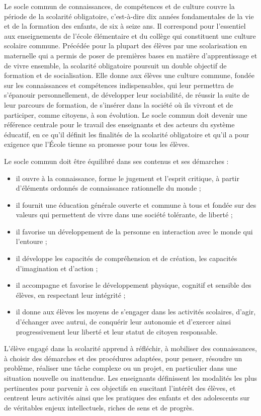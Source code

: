 Le socle commun de connaissances, de compétences et de culture couvre la période de la scolarité obligatoire, c’est-à-dire dix années fondamentales de la vie et de la formation des enfants, de six à seize ans. Il correspond pour l’essentiel aux enseignements de l’école élémentaire et du collège qui constituent une culture scolaire commune. Précédée pour la plupart des élèves par une scolarisation en maternelle qui a permis de poser de premières bases en matière d’apprentissage et de vivre ensemble, la scolarité obligatoire poursuit un double objectif de formation et de socialisation. Elle donne aux élèves une culture commune, fondée sur les connaissances et compétences indispensables, qui leur permettra de s’épanouir personnellement, de développer leur sociabilité, de réussir la suite de leur parcours de formation, de s’insérer dans la société où ils vivront et de participer, comme citoyens, à son évolution. Le socle commun doit devenir une référence centrale pour le travail des enseignants et des acteurs du système éducatif, en ce qu’il définit les finalités de la scolarité obligatoire et qu’il a pour exigence que l’École tienne sa promesse pour tous les élèves.

Le socle commun doit être équilibré dans ses contenus et ses démarches :
\begin{itemize}
\item il ouvre à la connaissance, forme le jugement et l’esprit critique, à partir d’éléments ordonnés de connaissance rationnelle du monde ;
\item il fournit une éducation générale ouverte et commune à tous et fondée sur des valeurs qui permettent de vivre dans une société tolérante, de liberté ;
\item il favorise un développement de la personne en interaction avec le monde qui l’entoure ;
\item il développe les capacités de compréhension et de création, les capacités d’imagination et d’action ;
\item il accompagne et favorise le développement physique, cognitif et sensible des élèves, en respectant leur intégrité ;
\item il donne aux élèves les moyens de s’engager dans les activités scolaires, d’agir, d’échanger avec autrui, de conquérir leur autonomie et d’exercer ainsi progressivement leur liberté et leur statut de citoyen responsable.\end{itemize}

L’élève engagé dans la scolarité apprend à réfléchir, à mobiliser des connaissances, à choisir des démarches et des procédures adaptées, pour penser, résoudre un problème, réaliser une tâche complexe ou un projet, en particulier dans une situation nouvelle ou inattendue. Les enseignants définissent les modalités les plus pertinentes pour parvenir à ces objectifs en suscitant l’intérêt des élèves, et centrent leurs activités ainsi que les pratiques des enfants et des adolescents sur de véritables enjeux intellectuels, riches de sens et de progrès.
 

